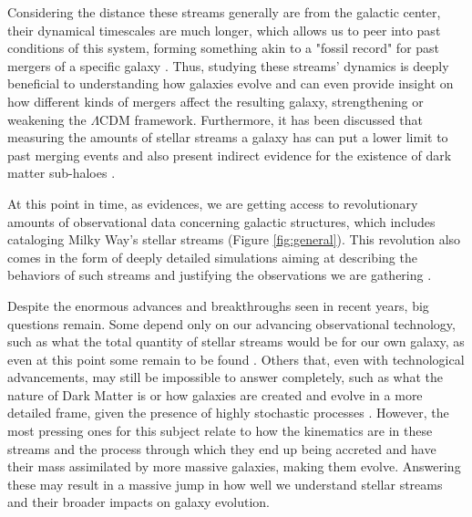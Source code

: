 \documentclass[linenumbers,trackchanges]{aastex7}
\begin{document}
Considering the distance these streams generally are from the galactic center, their dynamical timescales are much longer, which allows us to peer into past conditions of this system, forming something akin to a "fossil record" for past mergers of a specific galaxy \citep{Johnston1996-uv}. Thus, studying these streams' dynamics is deeply beneficial to understanding how galaxies evolve and can even provide insight on how different kinds of mergers affect the resulting galaxy, strengthening or weakening the $\Lambda$CDM framework. Furthermore, it has been discussed that measuring the amounts of stellar streams a galaxy has can put a lower limit to past merging events and also present indirect evidence for the existence of dark matter sub-haloes \citep{Malhan2018-mh}.

At this point in time, as \cite{Jensen2021-mw} evidences, we are getting access to revolutionary amounts of observational data concerning galactic structures, which includes cataloging Milky Way's stellar streams (Figure \ref{fig:general}). This revolution also comes in the form of deeply detailed simulations aiming at describing the behaviors of such streams and justifying the observations we are gathering \citep{Choi2007-lc}.

\begin{figure*}[ht!]
\caption{Chart demonstrating potential stream stars identified in \citep{Malhan2018-mh}. This evidences the astounding capability we have to identify these objects, however this only accounts for a small portion of all stream stars.}
\label{fig:general}
\end{figure*}

Despite the enormous advances and breakthroughs seen in recent years, big questions remain. Some depend only on our advancing observational technology, such as what the total quantity of stellar streams would be for our own galaxy, as even at this point some remain to be found \citep{Shipp2023-qz}. Others that, even with technological advancements, may still be impossible to answer completely, such as what the nature of Dark Matter is or how galaxies are created and evolve in a more detailed frame, given the presence of highly stochastic processes \citep{Amorisco2017-oc}. However, the most pressing ones for this subject relate to how the kinematics are in these streams and the process through which they end up being accreted and have their mass assimilated by more massive galaxies, making them evolve. Answering these may result in a massive jump in how well we understand stellar streams and their broader impacts on galaxy evolution. 
\end{document}
